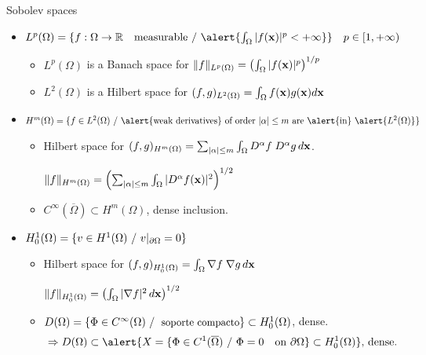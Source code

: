 \begin{frame}{Sobolev spaces}
  \small
  \begin{itemize}
  \setlength\itemsep{0.5em}
  \item<1->
    $L^p(\Omega)=\{ f: \Omega \to \Rset \quad \text{measurable} \st
    \alert{\int_\Omega |f(\xx)|^p < +\infty} \} \quad p \in [1,+\infty)$
    \begin{itemize}
      \setlength\itemsep{0.3em}
      \scriptsize
    \item $L^p(\Omega)$ is a Banach space for
      $\norm[L^p(\Omega)]{f}=\left(\int_\Omega|f(\xx)|^p\right)^{1/p}$
    \item $L^2(\Omega)$ is a Hilbert space for $(f,g)_{L^2(\Omega)}=\int_\Omega f(\xx) g(\xx) d\xx$
    \end{itemize}

  \item<2->
    $ H^m(\Omega) = \{ f\in L^2(\Omega) \st \text{\alert{weak derivatives} of
      order $|\alpha| \le m$ are \alert{in} } \alert{L^2(\Omega)} \} $
    \begin{itemize}
      \setlength\itemsep{0.3em}
      \scriptsize
    \item Hilbert space for
      $(f,g)_{H^m(\Omega)}=\sum_{|\alpha|\le m} \int_\Omega D^\alpha f
      \; D^\alpha g \,d\xx$.
      \par {} \quad
      $\norm[H^m(\Omega)]{f}=\left(\sum_{|\alpha|\le m} \int_\Omega|D^\alpha f(\xx)|^2\right)^{1/2}$
      \item $C^\infty(\overline\Omega) \subset H^m(\Omega)$, dense inclusion.
    \end{itemize}

  \item<3-> \alert{$H_0^1(\Omega) = \{ v \in H^1(\Omega) \st v|_{\partial\Omega}=0 \}$}
     \hfill{}
    \begin{itemize}
      \setlength\itemsep{0.3em}
      \scriptsize
    \item Hilbert space for
      $(f,g)_{H_0^1(\Omega)}=\int_\Omega \grad f \; \grad g \, d\xx $
      \par {} \quad
      $\norm[H_0^1(\Omega)]{f}=\left(\int_\Omega|\grad f|^2\, d\xx\right)^{1/2}$
    \item $D(\Omega) =\{ \small \Phi\in C^\infty(\Omega) \st \text{ soporte compacto} \}
      \subset H_0^1(\Omega)$, dense.
       \small
     $$\Rightarrow
      D(\Omega) \subset \alert{X=\{ \Phi\in C^1(\overline\Omega) \st \Phi=0 \quad \mbox{on
      } \partial\Omega\} \subset H_0^1(\Omega)} \text{, dense}.$$
    \end{itemize}
  \end{itemize}
\end{frame}

